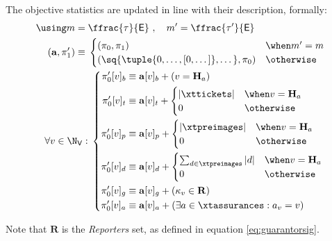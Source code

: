 
The objective statistics are updated in line with their description, formally:
\begin{align}
    \using m =\; &\ffrac{\tau}{\mathsf{E}} \ ,\quad m' = \ffrac{\tau'}{\mathsf{E}}\\
    (\mathbf{a}, \pi'_1) \equiv\;&\begin{cases}
        (\pi_0, \pi_1) &\when m' = m \\
        (\sq{\tuple{0, \dots, [0, \dots]}, \dots}, \pi_0) &\otherwise
    \end{cases}\\
    \forall v \in \N_\mathsf{V} :&\; \left\{\begin{aligned}
        \pi'_0[v]_b &\equiv \mathbf{a}[v]_b + (v = \mathbf{H}_a)\\
        \pi'_0[v]_t &\equiv \mathbf{a}[v]_t + \begin{cases}
            |\xttickets| &\when v = \mathbf{H}_a \\
            0 &\otherwise
        \end{cases}\\
        \pi'_0[v]_p &\equiv \mathbf{a}[v]_p + \begin{cases}
            |\xtpreimages| &\when v = \mathbf{H}_a \\
            0 &\otherwise
        \end{cases}\\
        \pi'_0[v]_d &\equiv \mathbf{a}[v]_d + \begin{cases}
            \sum_{d \in \xtpreimages}|d| &\when v = \mathbf{H}_a \\
            0 &\otherwise
        \end{cases}\\
        \pi'_0[v]_g &\equiv \mathbf{a}[v]_g + (\kappa_v \in \mathbf{R})\\
        \pi'_0[v]_a &\equiv \mathbf{a}[v]_a + (\exists a \in \xtassurances : a_v = v)
    \end{aligned}\right.
\end{align}

Note that $\mathbf{R}$ is the \emph{Reporters} set, as defined in equation \ref{eq:guarantorsig}.
